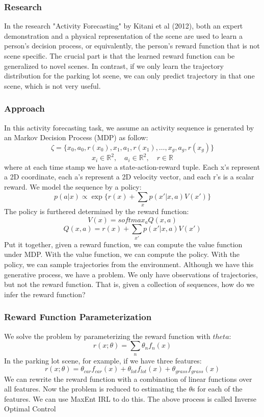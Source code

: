 \documentclass[11pt]{article}
\begin{document}
\subsubsection{Research}
In the research "Activity Forecasting" by Kitani et al (2012), both an expert demonstration and a physical representation of the scene are used to learn a person's decision process, or equivalently, the person's reward function that is not scene specific. The crucial part is that the learned reward function can be generalized to novel scenes. In contrast, if we only learn the trajectory distribution for the parking lot scene, we can only predict trajectory in that one scene, which is not very useful.

\subsubsection{Approach}
In this activity forecasting task, we assume an activity sequence is generated by an Markov Decision Process (MDP) as follow:
\[\zeta = \{x_0, a_0, r(x_0), x_1, a_1, r(x_1),\dots,x_g, a_g, r(x_g)\}\]
\[x_i \in \mathbb{R}^2,\quad a_i \in \mathbb{R}^2,\quad r \in \mathbb{R}\]
where at each time stamp we have a state-action-reward tuple. Each x's represent a 2D coordinate, each a's represent a 2D velocity vector, and each r's is a scalar reward. We model the sequence by a policy:
\[p(a|x) \propto \exp{\{r(x) + \sum_x p(x' | x,a) V(x')\}}\]
The policy is furthered determined by the reward function:
\[V(x) = softmax_a Q(x,a)\]
\[Q(x,a) = r(x) + \sum_{x'} p(x'|x,a) V(x')\]
Put it together, given a reward function, we can compute the value function under MDP. With the value function, we can compute the policy. With the policy, we can sample trajectories from the environment. Although we have this generative process, we have a problem. We only have observations of trajectories, but not the reward function. That is, given a collection of sequences, how do we infer the reward function?

\subsubsection{Reward Function Parameterization}
We solve the problem by parameterizing the reward function with \(theta\):
\[r(x;\theta) = \sum_n \theta_n f_n(x)\]
In the parking lot scene, for example, if we have three features:
\[r(x;\theta) = \theta_{car} f_{car}(x) + \theta_{lot} f_{lot}(x) + \theta_{grass} f_{grass}(x)\]
We can rewrite the reward function with a combination of linear functions over all features. Now the problem is reduced to estimating the \(\theta\)s for each of the features. We can use MaxEnt IRL to do this. The above process is called Inverse Optimal Control
\end{document}

